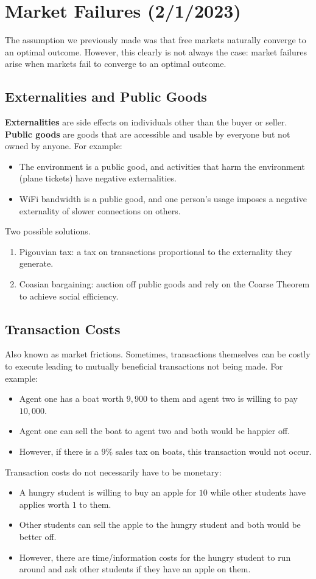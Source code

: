 \documentclass[dvipsnames]{article}
\theoremstyle{definition}
\theoremstyle{remark}
\begin{document}
\newpage

\section{Market Failures (2/1/2023)}
The assumption we previously made was that free markets naturally converge to an optimal outcome. However, this clearly is not always the case: market failures arise when markets fail to converge to an optimal outcome. 

\subsection{Externalities and Public Goods}
\textbf{Externalities} are side effects on individuals other than the buyer or seller. \textbf{Public goods} are goods that are accessible and usable by everyone but not owned by anyone. For example:
\begin{itemize}
	\item The environment is a public good, and activities that harm the environment (plane tickets) have negative externalities.
	\item WiFi bandwidth is a public good, and one person's usage imposes a negative externality of slower connections on others. 
\end{itemize}
Two possible solutions.
\begin{enumerate}
	\item Pigouvian tax: a tax on transactions proportional to the externality they generate.
	\item Coasian bargaining: auction off public goods and rely on the Coarse Theorem to achieve social efficiency. 
\end{enumerate}

\subsection{Transaction Costs}
Also known as market frictions. Sometimes, transactions themselves can be costly to execute leading to mutually beneficial transactions not being made. For example:
\begin{itemize}
	\item Agent one has a boat worth $9,900$ to them and agent two is willing to pay $10,000$.
	\item Agent one can sell the boat to agent two and both would be happier off. 
	\item However, if there is a $9\%$ sales tax on boats, this transaction would not occur. 
\end{itemize}
Transaction costs do not necessarily have to be monetary:
\begin{itemize}
	\item A hungry student is willing to buy an apple for $10$ while other students have applies worth $1$ to them. 
	\item Other students can sell the apple to the hungry student and both would be better off.
	\item However, there are time/information costs for the hungry student to run around and ask other students if they have an apple on them.
\end{itemize}
\end{document}
